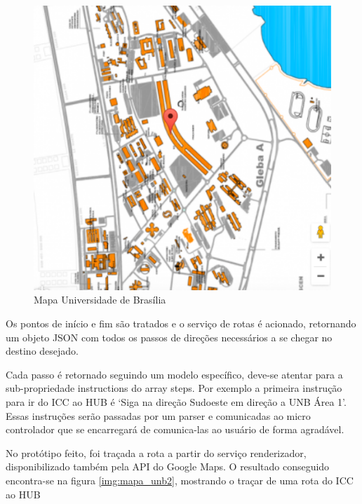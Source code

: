 \graphicspath{{figuras/}}
\begin{figure}[!htb]
\centering
\includegraphics[scale=0.80]{mapa_unb_1}
\caption{Mapa Universidade de Brasília}
\label{img:mapa_unb}
\end{figure}

Os pontos de início e fim são tratados e o serviço de rotas é acionado, retornando um objeto JSON com todos os passos de direções necessários a se chegar no destino desejado.

Cada passo é retornado seguindo um modelo específico, deve-se atentar para a sub-propriedade instructions do array steps. Por exemplo a primeira instrução para ir do ICC ao HUB é ‘Siga na direção Sudoeste em direção a UNB Área 1’. Essas instruções serão passadas por um parser e comunicadas ao micro controlador que se encarregará de comunica-las ao usuário de forma agradável.

No protótipo feito, foi traçada a rota a partir do serviço renderizador, disponibilizado também pela API do Google Maps. O resultado conseguido encontra-se na figura \ref{img:mapa_unb2}, mostrando o traçar de uma rota do ICC ao HUB

